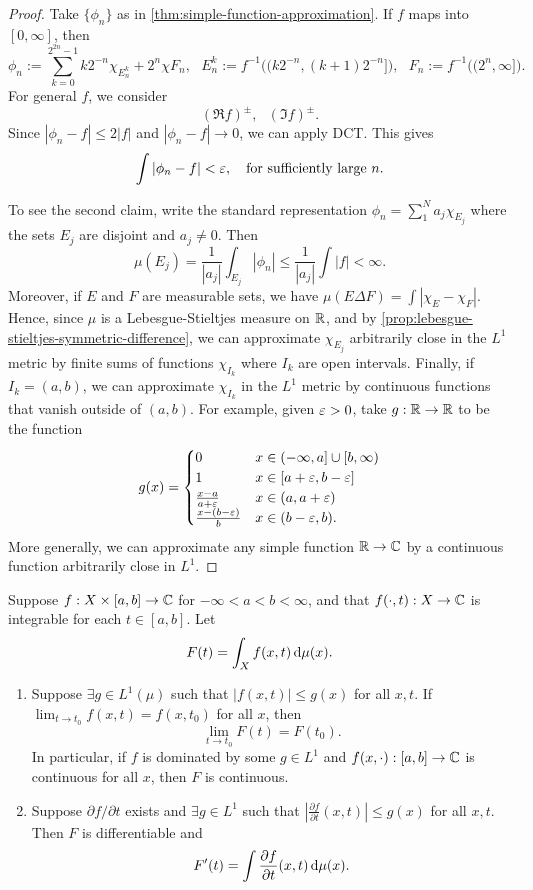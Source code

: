 \documentclass[12pt]{article} %
\begin{document}
\begin{proof}
    Take $\{\phi_n\}$ as in \cref{thm:simple-function-approximation}. If $f$ maps into $[0, \infty]$, then \[\phi_n := \sum_{k = 0}^{2^{2n} - 1} k 2^{-n} \chi_{E_n^k} + 2^n \chi F_n, \ \ \ E_n^k := f^{-1}\Big((k2^{-n}, (k+1)2^{-n}]\Big), \ \ \ F_n := f^{-1}\Big( (2^n, \infty]\Big).\] For general $f$, we consider \[(\Re f)^{\pm}, \ \ \ (\Im f)^{\pm}.\] Since $|\phi_n - f| \leq 2|f|$ and $|\phi_n - f| \to 0$, we can apply DCT. This gives \[\int |\phi_n - f| < \varepsilon, \ \ \ \text{for sufficiently large $n$}.\]

    To see the second claim, write the standard representation $\phi_n = \sum_1^N a_j \chi_{E_j}$ where the sets $E_j$ are disjoint and $a_j \neq 0$. Then \[\mu(E_j) = \frac{1}{|a_j|} \int_{E_j}|\phi_n| \leq \frac{1}{|a_j|} \int |f| < \infty.\] Moreover, if $E$ and $F$ are measurable sets, we have $\mu(E \Delta F) = \int |\chi_E - \chi_F|$. Hence, since $\mu$ is a Lebesgue-Stieltjes measure on $\mathbb{R}$, and by \cref{prop:lebesgue-stieltjes-symmetric-difference}, we can approximate $\chi_{E_j}$ arbitrarily close in the $L^1$ metric by finite sums of functions $\chi_{I_k}$ where $I_k$ are open intervals. Finally, if $I_k = (a, b)$, we can approximate $\chi_{I_k}$ in the $L^1$ metric by continuous functions that vanish outside of $(a, b)$. For example, given $\varepsilon > 0$, take $g : \mathbb{R} \to \mathbb{R}$ to be the function \[g(x) = \begin{cases}
        0 &x \in (-\infty, a] \cup [b, \infty)\\
        1 &x \in [a + \varepsilon, b - \varepsilon]\\
        \frac{x-a}{a+\varepsilon} &x \in (a, a+ \varepsilon)\\
        \frac{x- (b - \varepsilon)}{b} &x \in (b-\varepsilon, b).
    \end{cases}\]
    More generally, we can approximate any simple function $\mathbb{R} \to \mathbb{C}$ by a continuous function arbitrarily close in $L^1$.
\end{proof}

\begin{theorem}
    Suppose $f : X \times [a, b] \to \mathbb{C}$ for $-\infty < a < b < \infty$, and that $f(\cdot, t) : X \to \mathbb{C}$ is integrable for each $t \in [a, b]$. Let \[F(t) = \int_X f(x, t) \, \mathrm{d} \mu(x).\] \begin{enumerate}
        \item Suppose $\exists g \in L^1(\mu)$ such that $|f(x, t)| \leq g(x)$ for all $x, t$. If $\lim_{t \to t_0} f(x, t) = f(x,t_0)$ for all $x$, then \[\lim_{t \to t_0} F(t) = F(t_0).\] In particular, if $f$ is dominated by some $g \in L^1$ and $f(x, \cdot) : [a, b] \to \mathbb{C}$ is continuous for all $x$, then $F$ is continuous.
        \item Suppose $\partial f / \partial t$ exists and $\exists g \in L^1$ such that $\left| \frac{\partial f}{\partial t}(x, t) \right| \leq g(x)$ for all $x, t$. Then $F$ is differentiable and \[F'(t) = \int \frac{\partial f}{\partial t}(x, t) \, \mathrm{d} \mu(x).\]
    \end{enumerate}
\end{theorem}
\end{document}
